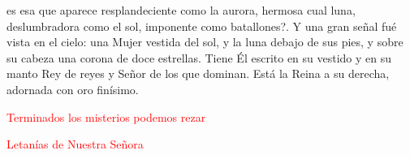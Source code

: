 \documentclass[10pt,oneside]{book}
\begin{document}
\begin{center}
      
\end{center}

es esa que aparece resplandeciente como la aurora, hermosa cual luna, deslumbradora como el sol, imponente como batallones?.
Y una gran señal fué vista en el cielo: una Mujer vestida del sol, y la luna debajo de sus  pies, y sobre su cabeza una corona de doce estrellas.
Tiene Él escrito en su vestido y en su manto Rey de reyes y Señor de los que dominan. Está la Reina a su derecha, adornada con oro finísimo.

\begin{center}
      {}
\end{center}
\label{final-prayer}
\begin{center}
      \textcolor{red}{Terminados los misterios podemos rezar}
\end{center}

\begin{paracol}{2}
      
      \vspace{1mm}
      \switchcolumn
      
      \switchcolumn*
      
      \vspace{1mm}
      \switchcolumn
      
      \switchcolumn*
      
      \vspace{1mm}
      \switchcolumn
      
      \switchcolumn*
      
      \switchcolumn
      
\end{paracol}

\vspace*{3mm}
\begin{center}
      \textcolor{red}{Letanías de Nuestra Señora}
\end{center}
\end{document}
